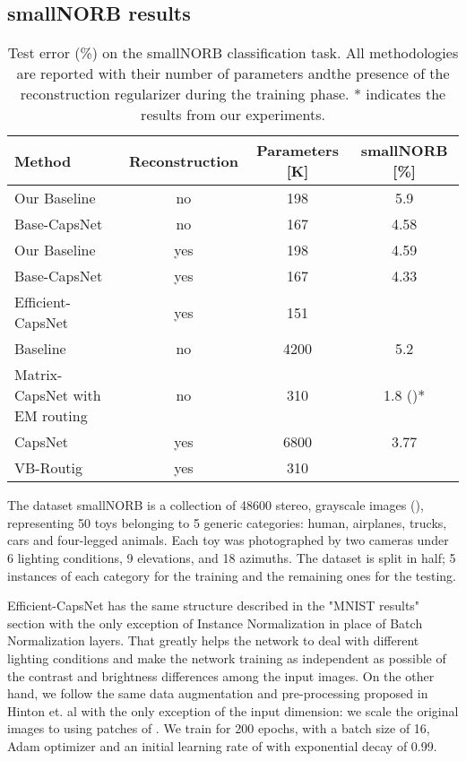 \documentclass{article}
\begin{document}
\subsection{smallNORB results}
\begin{table}[h]
\centering
\begin{tabular}{lccc}
\toprule
Method                         & Reconstruction & Parameters {[}K{]} & smallNORB {[}\%{]} \\ \hline
Our Baseline                   & no             & 198                & 5.9            \\ 
Base-CapsNet                   & no             & 167                & 4.58           \\ 
Our Baseline                   & yes            & 198                & 4.59           \\ 
Base-CapsNet                   & yes            & 167                & 4.33           \\ 
Efficient-CapsNet              & yes            & 151                &   \\ \hline
Baseline \cite{hinton2018matrix}                      & no             & 4200               & 5.2            \\ 
Matrix-CapsNet with EM routing \cite{hinton2018matrix} & no             & 310                & 1.8 ()*          \\ 
CapsNet \cite{sabour2017dynamic}                        & yes            & 6800               & 3.77           \\ 
VB-Routig \cite{ribeiro2020capsule}                      & yes            & 310                &     \\ \bottomrule
\end{tabular}
\caption{Test error (\%) on the smallNORB classification task. All methodologies are reported with their number of parameters andthe presence of the reconstruction regularizer during the training phase. * indicates the results from our experiments.}
\label{tab:results_smallnorb}
\end{table}
The dataset smallNORB is a collection of 48600 stereo, grayscale images (), representing 50 toys belonging to 5 generic categories: human, airplanes, trucks, cars and four-legged animals. Each toy was photographed by two cameras under 6 lighting conditions, 9 elevations, and 18 azimuths. The dataset is split in half; 5 instances of each category for the training and the remaining ones for the testing.

Efficient-CapsNet has the same structure described in the "MNIST results" section with the only exception of Instance Normalization \cite{ulyanov2016instance} in place of Batch Normalization layers. That greatly helps the network to deal with different lighting conditions and make the network training as independent as possible of the contrast and brightness differences among the input images.
On the other hand, we follow the same data augmentation and pre-processing proposed in Hinton et. al \cite{hinton2018matrix} with the only exception of the input dimension: we scale the original images to  using patches of . We train for 200 epochs, with a batch size of 16, Adam optimizer and an initial learning rate of  with exponential decay of 0.99.
\end{document}
